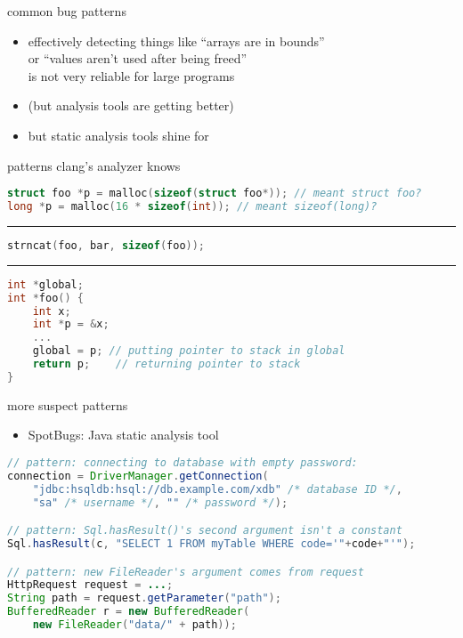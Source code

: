 \begin{frame}{common bug patterns}
    \begin{itemize}
    \item effectively detecting things like ``arrays are in bounds'' \\
        or ``values aren't used after being freed'' \\
        is not very reliable for large programs
    \item (but analysis tools are getting better)
    \vspace{.5cm}
    \item but static analysis tools shine for 
    \end{itemize}
\end{frame}

\begin{frame}[fragile,label=suspectPatterns]{patterns clang's analyzer knows}
\begin{lstlisting}[language=C,style=smaller]
struct foo *p = malloc(sizeof(struct foo*)); // meant struct foo?
long *p = malloc(16 * sizeof(int)); // meant sizeof(long)?
\end{lstlisting}
\hrule
\begin{lstlisting}[language=C,style=smaller]
strncat(foo, bar, sizeof(foo));
\end{lstlisting}
\hrule
\begin{lstlisting}[language=C,style=smaller]
int *global;
int *foo() {
    int x;
    int *p = &x;
    ...
    global = p; // putting pointer to stack in global
    return p;    // returning pointer to stack
}
\end{lstlisting}
\end{frame}

\begin{frame}[fragile,label=suspectPatterns]{more suspect patterns }
    \begin{itemize}
    \item SpotBugs: Java static analysis tool
    \end{itemize}
\begin{lstlisting}[language=Java,style=smaller]
// pattern: connecting to database with empty password:
connection = DriverManager.getConnection(
    "jdbc:hsqldb:hsql://db.example.com/xdb" /* database ID */, 
    "sa" /* username */, "" /* password */);

// pattern: Sql.hasResult()'s second argument isn't a constant
Sql.hasResult(c, "SELECT 1 FROM myTable WHERE code='"+code+"'");

// pattern: new FileReader's argument comes from request
HttpRequest request = ...;
String path = request.getParameter("path");
BufferedReader r = new BufferedReader(
    new FileReader("data/" + path));
\end{lstlisting}
\end{frame}
